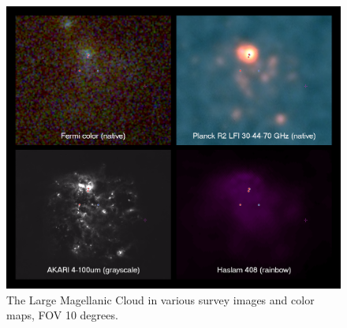 \begin{figure}[h]
  \centerline{\includegraphics[width=\textwidth]{figures/LMC_region}}
  \caption{The Large Magellanic Cloud in various survey images and color maps, FOV 10 degrees.}
\end{figure}






